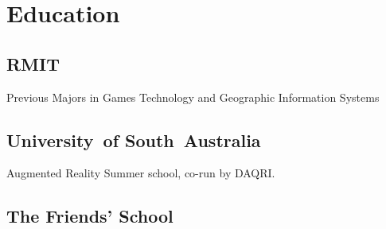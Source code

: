 \documentclass[a4paper]{deedy-resume-twopage} %
\begin{document}
\begin{minipage}[t]{0.33\textwidth} %


  \section{Education}

  \subsection{RMIT}

  Previous Majors in Games Technology and Geographic Information Systems \\

  \sectionspace %

  \subsection{University\hbox{ }of South~Australia}


  Augmented Reality Summer school, co-run by DAQRI. \\

  \sectionspace %


  \subsection{The Friends' School}


\end{minipage}
\end{document}
